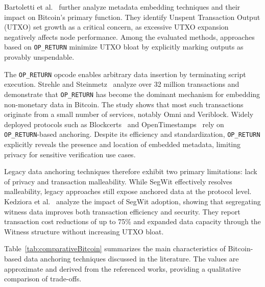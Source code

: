 Bartoletti et al.~\cite{Bartoletti2019BitcoinMetadata} further analyze metadata embedding techniques and their impact on Bitcoin’s primary function.
They identify Unspent Transaction Output (UTXO) set growth as a critical concern, as excessive UTXO expansion negatively affects node performance.
Among the evaluated methods, approaches based on \texttt{OP\_RETURN} minimize UTXO bloat by explicitly marking outputs as provably unspendable.

The \texttt{OP\_RETURN} opcode enables arbitrary data insertion by terminating script execution.
Strehle and Steinmetz~\cite{Strehle2020DominatingOPReturns} analyze over 32 million transactions and demonstrate that \texttt{OP\_RETURN} has become the dominant mechanism for embedding non-monetary data in Bitcoin.
The study shows that most such transactions originate from a small number of services, notably Omni and Veriblock.
Widely deployed protocols such as Blockcerts~\cite{Blockcerts} and OpenTimestamps~\cite{OpenTimestamps} rely on \texttt{OP\_RETURN}-based anchoring.
Despite its efficiency and standardization, \texttt{OP\_RETURN} explicitly reveals the presence and location of embedded metadata, limiting privacy for sensitive verification use cases.

Legacy data anchoring techniques therefore exhibit two primary limitations: lack of privacy and transaction malleability.
While SegWit effectively resolves malleability, legacy approaches still expose anchored data at the protocol level.
Kedziora et al.~\cite{Kedziora2022AnalysisSegWit} analyze the impact of SegWit adoption, showing that segregating witness data improves both transaction efficiency and security.
They report transaction cost reductions of up to 75\% and expanded data capacity through the Witness structure without increasing UTXO bloat.

Table~\ref{tab:comparativeBitcoin} summarizes the main characteristics of Bitcoin-based data anchoring techniques discussed in the literature.
The values are approximate and derived from the referenced works, providing a qualitative comparison of trade-offs.

